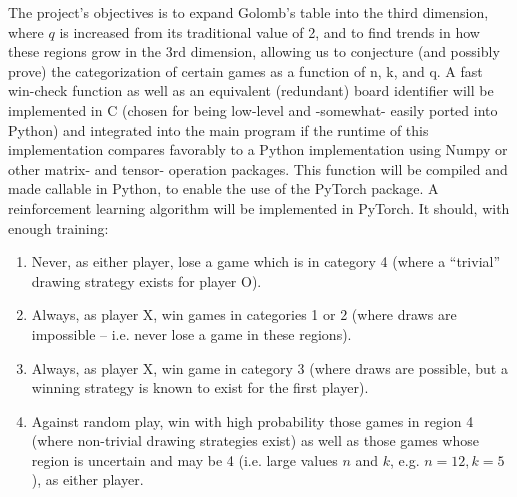 \documentclass[english, 11pt]{article}
\begin{document}
The project’s objectives is to expand Golomb’s table into the third dimension, where $q$ is increased from its traditional value of 2, and to find trends in how these regions grow in the 3rd dimension, allowing us to conjecture (and possibly prove) the categorization of certain games as a function of n, k, and q. 
A fast win-check function as well as an equivalent (redundant) board identifier will be implemented in C (chosen for being low-level and -somewhat- easily ported into Python) and integrated into the main program if the runtime of this implementation compares favorably to a Python implementation using Numpy or other matrix- and tensor- operation packages. This function will be compiled and made callable in Python, to enable the use of the PyTorch package. 
A reinforcement learning algorithm will be implemented in PyTorch. It should, with enough training: 
\begin{enumerate}
	\item Never, as either player, lose a game which is in category 4 (where a “trivial” drawing strategy exists for player O).
	\item Always, as player X, win games in categories 1 or 2 (where draws are impossible – i.e. never lose a game in these regions).
	\item Always, as player X, win game in category 3 (where draws are possible, but a winning strategy is known to exist for the first player).
	\item Against random play, win with high probability those games in region 4 (where non-trivial drawing strategies exist) as well as those games whose region is uncertain and may be 4 (i.e. large values $n$ and $k$, e.g. $n=12, k=5$), as either player. 
	
\end{enumerate}
\end{document}

